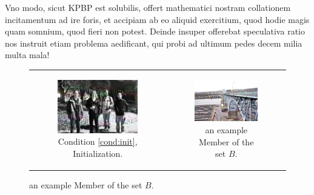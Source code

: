 \documentclass[twocolumn]{article}
\theoremstyle{plain}  %
\theoremstyle{definition}  %
\theoremstyle{remark}  %
\begin{document}
Vno modo, sicut KPBP est solubilis, offert mathematici nostram collationem incitamentum ad ire foris, et accipiam ab eo aliquid exercitium, quod hodie magis quam somnium, quod fieri non potest.
Deinde insuper offerebat speculativa ratio nos instruit etiam problema aedificant, qui probi ad ultimum pedes decem milia multa mala!

\renewcommand\refname{REFERENCES.}




\begin{figure}[b]
	\begin{tabular}{cc}
	\begin{subfigure}[b]{0.45\textwidth}
	\centering
	\includegraphics[width=\textwidth]{initialization.png}
	\caption{Condition \ref{cond:init}, Initialization.}
	\end{subfigure}
	&
	\begin{subfigure}[b]{0.45\textwidth}
	\centering
	\includegraphics[width=\textwidth]{mckees.png}
	\caption{an example Member of the set $B$.}
	\end{subfigure}
	\\


\end{tabular}
\end{figure}
\end{document}
